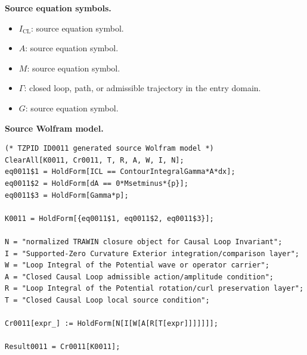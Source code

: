 \begin{minipage}[t]{0.49\linewidth}
\begingroup
\small
\raggedright
\textbf{Source equation symbols.}\par
\begin{itemize}[leftmargin=1.35em,itemsep=1pt,topsep=1pt,parsep=0pt]
    \item $I_{\mathrm{CL}}$: source equation symbol.
    \item $A$: source equation symbol.
    \item $M$: source equation symbol.
    \item $\Gamma$: closed loop, path, or admissible trajectory in the entry domain.
    \item $G$: source equation symbol.
\end{itemize}
\endgroup
\end{minipage}\hfill
\begin{minipage}[t]{0.47\linewidth}
\begingroup
\scriptsize
\raggedright
\textbf{Source Wolfram model.}\par
\begin{Verbatim}[fontsize=\tiny,breaklines=true,breakanywhere=true]
(* TZPID ID0011 generated source Wolfram model *)
ClearAll[K0011, Cr0011, T, R, A, W, I, N];
eq0011$1 = HoldForm[ICL == ContourIntegralGamma*A*dx];
eq0011$2 = HoldForm[dA == 0*Msetminus*{p}];
eq0011$3 = HoldForm[Gamma*p];

K0011 = HoldForm[{eq0011$1, eq0011$2, eq0011$3}];

N = "normalized TRAWIN closure object for Causal Loop Invariant";
I = "Supported-Zero Curvature Exterior integration/comparison layer";
W = "Loop Integral of the Potential wave or operator carrier";
A = "Closed Causal Loop admissible action/amplitude condition";
R = "Loop Integral of the Potential rotation/curl preservation layer";
T = "Closed Causal Loop local source condition";

Cr0011[expr_] := HoldForm[N[I[W[A[R[T[expr]]]]]]];

Result0011 = Cr0011[K0011];
\end{Verbatim}
\endgroup
\end{minipage}

